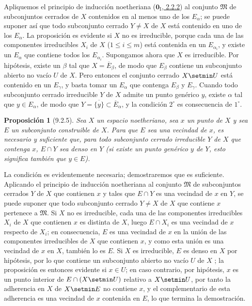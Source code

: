 \documentclass[10pt,oneside,openany]{book}
\theoremstyle{egaenv}\newtheorem*{env}{---}
\theoremstyle{egastatement}
\newtheorem*{proposition}{Proposición}
\theoremstyle{egadescription}
\newcommand{\oldpage}[2][]{\marginnote{\normalfont\scriptsize\textbf{#1}\,|\,#2}\ignorespaces}
\renewcommand{\leq}{\leqslant}
\begin{document}
Apliquemos el principio de inducción noetheriana
(\hyperref[0.2.2.2-fr]{$\mathbf{0}_{\mathrm I}$, 2.2.2}) al conjunto
$\mathfrak{M}$ de subconjuntos cerrados de $X$ contenidos en al menos uno de los $E_\alpha$; se puede suponer así que todo subconjunto cerrado $Y\ne X$ de $X$ está contenido en uno de los $E_\alpha$.
La proposición es evidente si $X$ no es irreducible, porque cada una de las componentes irreducibles $X_i$ de $X$ ($1\leq i\leq m$) está contenida en un $E_{\alpha_i}$, y existe un $E_\alpha$ que contiene todos los $E_{\alpha_i}$.
Supongamos ahora que $X$ es irreducible.
Por hipótesis, existe un $\beta$ tal que $X=\overline{E}_\beta$, de modo que  $E_\beta$ contiene un subconjunto abierto no vacío $U$ de $X$.
Pero entonces el conjunto cerrado $X\setmin U$ está contenido en un $E_\gamma$, y basta tomar un $E_\alpha$ que contenga $E_\beta$ y $E_\gamma$.
Cuando todo subconjunto cerrado irreducible $Y$ de $X$
\oldpage[0\textsubscript{III}]{16}
admite un punto genérico $y$, existe $\alpha$ tal que $y\in E_\alpha$, de modo que $Y=\overline{\{y\}}\subset\overline{E}_\alpha$, y la condición $2^\circ$ es consecuencia de $1^\circ$.

\begin{proposition}[9.2.5]
\label{0.9.2.5}
\label{0.9.2.5-fr}
Sea $X$ un espacio noetheriano, sea $x$ un punto de $X$ y sea $E$ un subconjunto construible de $X$.
Para que $E$ sea una vecindad de $x$, es necesario y suficiente que, para todo subconjunto cerrado irreducible $Y$ de $X$ que contenga $x$, $E\cap Y$ sea denso en $Y$ (si existe un punto genérico $y$ de $Y$, esto significa también \textup{} que $y\in E$).
\end{proposition}


La condición es evidentemente necesaria; demostraremos que es suficiente.
Aplicando el principio de inducción noetheriana al conjunto $\mathfrak{M}$ de subconjuntos cerrados $Y$ de $X$ que contienen $x$ y tales que $E\cap Y$ es una vecindad de $x$ en $Y$, se puede suponer que todo subconjunto cerrado $Y\ne X$ de $X$ que contiene $x$ pertenece a $\mathfrak{M}$.
Si $X$ no es irreducible, cada una de las componentes irreducibles $X_i$ de $X$ que contienen $x$ es distinta de $X$, luego $E\cap X_i$ es una vecindad de $x$ respecto de $X_i$; en consecuencia, $E$ es una vecindad de $x$ en la unión de las componentes irreducibles de $X$ que contienen $x$, y como esta unión es una vecindad de $x$ en $X$, también lo es $E$.
Si $X$ es irreducible, $E$ es denso en $X$ por hipótesis, por lo que contiene un subconjunto abierto no vacío $U$ de $X$ ; la proposición es entonces evidente si $x\in U$; en caso contrario, por hipótesis, $x$ es un punto interior de $E\cap(X\setmin U)$ relativo a $X\setmin U$, por tanto la adherencia en
$X$ de $X\setmin E$ no contiene $x$, y el complementario de esta adherencia es una vecindad de $x$ contenida en $E$, lo que termina la demostración.
\end{document}

